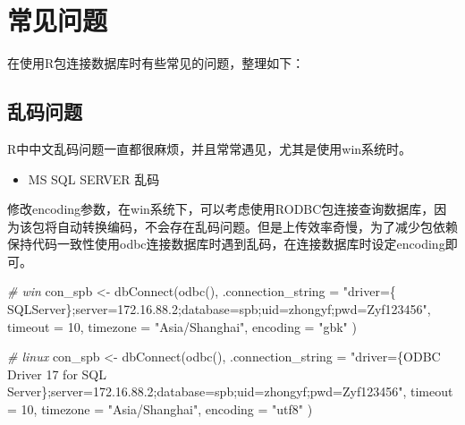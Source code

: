 \documentclass[
]{book}
\newenvironment{Shaded}{\begin{snugshade}}{\end{snugshade}}
\newcommand{\AttributeTok}[1]{\textcolor[rgb]{0.77,0.63,0.00}{#1}}
\newcommand{\CommentTok}[1]{\textcolor[rgb]{0.56,0.35,0.01}{\textit{#1}}}
\newcommand{\DecValTok}[1]{\textcolor[rgb]{0.00,0.00,0.81}{#1}}
\newcommand{\FunctionTok}[1]{\textcolor[rgb]{0.00,0.00,0.00}{#1}}
\newcommand{\NormalTok}[1]{#1}
\newcommand{\OtherTok}[1]{\textcolor[rgb]{0.56,0.35,0.01}{#1}}
\newcommand{\StringTok}[1]{\textcolor[rgb]{0.31,0.60,0.02}{#1}}
\providecommand{\tightlist}{%
  \setlength{\itemsep}{0pt}\setlength{\parskip}{0pt}}
\begin{document}
\hypertarget{ux5e38ux89c1ux95eeux9898-1}{%
\section{常见问题}\label{ux5e38ux89c1ux95eeux9898-1}}

在使用R包连接数据库时有些常见的问题，整理如下：

\hypertarget{ux4e71ux7801ux95eeux9898}{%
\subsection{乱码问题}\label{ux4e71ux7801ux95eeux9898}}

R中中文乱码问题一直都很麻烦，并且常常遇见，尤其是使用win系统时。

\begin{itemize}
\tightlist
\item
  MS SQL SERVER 乱码
\end{itemize}

修改encoding参数，在win系统下，可以考虑使用RODBC包连接查询数据库，因为该包将自动转换编码，不会存在乱码问题。但是上传效率奇慢，为了减少包依赖保持代码一致性使用odbc连接数据库时遇到乱码，在连接数据库时设定encoding即可。

\begin{Shaded}
\begin{Highlighting}[]
\CommentTok{\# win}
\NormalTok{con\_spb }\OtherTok{\textless{}{-}} \FunctionTok{dbConnect}\NormalTok{(}\FunctionTok{odbc}\NormalTok{(),}
  \AttributeTok{.connection\_string =}
    \StringTok{"driver=\{ SQLServer\};server=172.16.88.2;database=spb;uid=zhongyf;pwd=Zyf123456"}\NormalTok{, }
  \AttributeTok{timeout =} \DecValTok{10}\NormalTok{, }\AttributeTok{timezone =} \StringTok{"Asia/Shanghai"}\NormalTok{, }\AttributeTok{encoding =} \StringTok{"gbk"}
\NormalTok{)}

\CommentTok{\# linux }
\NormalTok{con\_spb }\OtherTok{\textless{}{-}} \FunctionTok{dbConnect}\NormalTok{(}\FunctionTok{odbc}\NormalTok{(),}
                     \AttributeTok{.connection\_string =}
                       \StringTok{"driver=\{ODBC Driver 17 for SQL Server\};server=172.16.88.2;database=spb;uid=zhongyf;pwd=Zyf123456"}\NormalTok{, }
                     \AttributeTok{timeout =} \DecValTok{10}\NormalTok{, }\AttributeTok{timezone =} \StringTok{"Asia/Shanghai"}\NormalTok{, }\AttributeTok{encoding =} \StringTok{"utf8"}
\NormalTok{)}
\end{Highlighting}
\end{Shaded}
\end{document}
